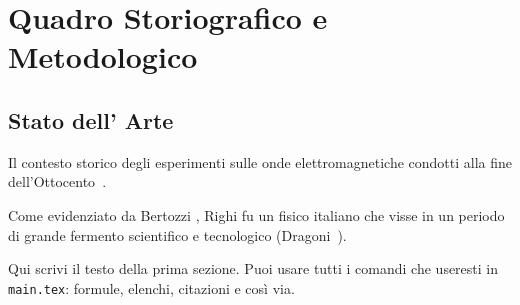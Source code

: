 \chapter{Quadro Storiografico e Metodologico}
\section{Stato dell' Arte}
Il contesto storico degli esperimenti sulle
onde elettromagnetiche condotti alla fine dell'Ottocento~\cite{righi1897ottica}.

Come evidenziato da Bertozzi \cite{bertozzi2020augusto}, Righi fu un fisico italiano che visse in un periodo 
di grande fermento scientifico e tecnologico (Dragoni~\cite{dragonirighi2023}).

Qui scrivi il testo della prima sezione. Puoi usare tutti i comandi
che useresti in \texttt{main.tex}: formule, elenchi, citazioni e così via.
